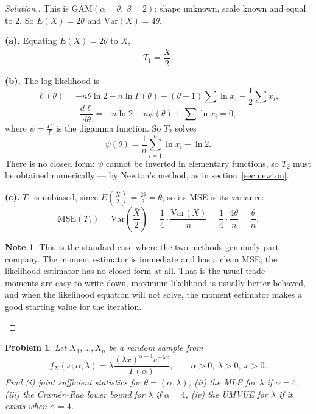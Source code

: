 \documentclass[12pt,a4paper]{report}
\theoremstyle{definition}
\newtheorem{note}[thm]{Note}
\theoremstyle{plain}
\newtheorem{problemx}{Problem}[section]
\newenvironment{problem}{\begin{problemx}}{\end{problemx}}
\newenvironment{solution}
  {\renewcommand{\qedsymbol}{}\begin{proof}[\textit{Solution}.]}
  {\end{proof}}
\begin{document}
\begin{solution}
This is $\text{GAM}(\alpha=\theta,\ \beta=2)$: shape unknown, scale known and equal
to $2$. So $E(X)=2\theta$ and $\text{Var}(X)=4\theta$.

\textbf{(a).} Equating $E(X)=2\theta$ to $\bar X$,
\[T_1=\frac{\bar X}{2}.\]

\textbf{(b).} The log-likelihood is
\[\ell(\theta)=-n\theta\ln 2-n\ln\Gamma(\theta)+(\theta-1)\sum\ln x_i
-\frac{1}{2}\sum x_i,\]
\[\frac{d\ell}{d\theta}=-n\ln 2-n\psi(\theta)+\sum\ln x_i=0,\]
where $\psi=\frac{\Gamma'}{\Gamma}$ is the digamma function. So $T_2$ solves
\[\psi(\theta)=\frac{1}{n}\sum_{i=1}^n\ln x_i-\ln 2.\]
There is no closed form: $\psi$ cannot be inverted in elementary functions, so
$T_2$ must be obtained numerically --- by Newton's method, as in section~\ref{sec:newton}.

\textbf{(c).} $T_1$ is unbiased, since
$E\left(\frac{\bar X}{2}\right)=\frac{2\theta}{2}=\theta$, so its MSE is its
variance:
\[\text{MSE}(T_1)=\text{Var}\!\left(\frac{\bar X}{2}\right)
=\frac{1}{4}\cdot\frac{\text{Var}(X)}{n}=\frac{1}{4}\cdot\frac{4\theta}{n}
=\frac{\theta}{n}.\]

\begin{note}
This is the standard case where the two methods genuinely part company. The moment
estimator is immediate and has a clean MSE; the likelihood estimator has no closed
form at all. That is the usual trade --- moments are easy to write down, maximum
likelihood is usually better behaved, and when the likelihood equation will not
solve, the moment estimator makes a good starting value for the iteration.
\end{note}
\end{solution}


\begin{problem}
Let $X_1,\ldots,X_n$ be a random sample from
\[f_X(x;\alpha,\lambda)=\lambda\frac{(\lambda x)^{\alpha-1}e^{-\lambda x}}
{\Gamma(\alpha)},\qquad \alpha>0,\ \lambda>0,\ x>0.\]
Find (i) joint sufficient statistics for $\theta=(\alpha,\lambda)$, (ii) the MLE
for $\lambda$ if $\alpha=4$, (iii) the Cram\'er--Rao lower bound for $\lambda$ if
$\alpha=4$, (iv) the UMVUE for $\lambda$ if it exists when $\alpha=4$.
\end{problem}
\end{document}
